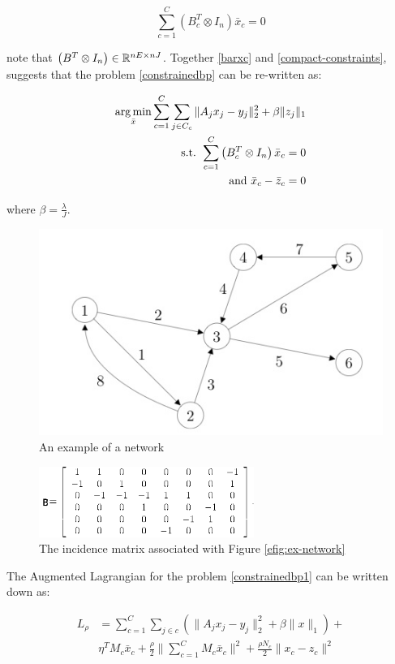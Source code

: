 \documentclass{article}
\begin{document}
\begin{equation}
\sum_{c=1}^C\left(B_c^T \otimes I_n\right)\bar{x}_c = 0
\label{compact-constraints}
\end{equation}

note that \(\left(B^T\otimes I_n \right) \in {\mathbb{R}}^{nE \times nJ}\). Together \eqref{barxc} and \eqref{compact-constraints}, suggests that the problem \eqref{constrainedbp} can be re-written as:

\begin{align}
\operatorname*{arg\,min}_{\bar{x}} \sum_{c=1}^C \sum_{j \in C_c} \|A_jx_j - y_j\|_2^2 + \beta\|z_j\|_1
\\
\text{ s.t. } \sum_{c=1}^C\left(B_c^T \otimes I_n\right)\bar{x}_c = 0 \\
\text{ and } \bar{x}_c - \bar{z}_c = 0
\label{constrainedbp1}
\end{align}

where \(\beta = \frac{\lambda}{J}\).

\begin{figure}[h]
\centering
\includegraphics[height = 5 cm]{network-ex-incidence-mat.jpg}
\caption{An example of a network}
\label{efig:ex-network}
\end{figure}

\begin{figure}[h]
\centering
\includegraphics[height = 3 cm, width = 7cm]{ex-incidencematrix1.png}
\caption{The incidence matrix associated with Figure \eqref{efig:ex-network}}
\label{fig:incidence-matrix}
\end{figure}

The Augmented Lagrangian for the problem \eqref{constrainedbp1} can be written down as:

\begin{align}
L_\rho &= \sum_{c=1}^C \sum_{j \in c}  \left(\|A_jx_j - y_j\|_2^2 + \beta\|x\|_1 \right) + \nonumber \\
&\eta^TM_c\bar{x}_c + \frac{\rho}{2}\|\sum_{c=1}^CM_c\bar{x}_c\|^2  + \frac{\rho N_c}{2}\|x_c-z_c\|^2
\label{aug-lagrange}
\end{align}
\end{document}
